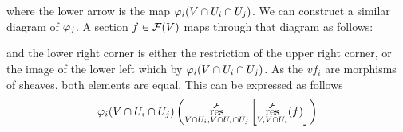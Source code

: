 \documentclass[12pt]{memoir}
\begin{document}
\begin{ptcbr}
\begin{enumerate}[i)]
\begin{center}
\end{center}
where the lower arrow is the map $\varphi_i(V\cap U_i\cap U_j)$. We can construct a similar diagram of $\varphi_j$. A section $f\in\mathcal{F}(V)$ maps through that diagram as follows: 
\begin{center}
\end{center}
and the lower right corner is either the restriction of the upper right corner, or the image of the lower left which by $\varphi_i(V\cap U_i\cap U_j)$. As the $vf_i$ are morphisms of sheaves, both elements are equal. This can be expressed as follows
\begin{align*}
    &\vf_i(V\cap U_i\cap U_j)\left(\res^{\cF}_{V\cap U_i,V\cap U_i\cap U_j}\bonj{\res^{\cF}_{V,V\cap U_i}(f)}\right)\\

\end{align*}
\end{enumerate}
\end{ptcbr}
\end{document}
